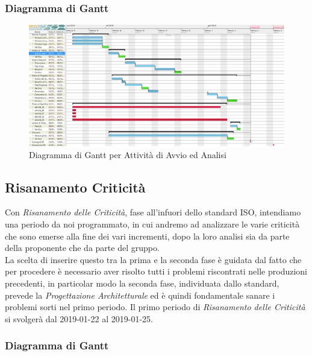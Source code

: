 \begin{landscape}
\subsubsection{Diagramma di Gantt}
\begin{figure}[H]
	\centering
  		\includegraphics[width=1.0\linewidth]{./images/AvvioAnalisi.png}
  		\caption{Diagramma di Gantt per Attività di Avvio ed Analisi}
  		\label{fig:Gantt Avvio ed Analisi}
\end{figure}
\end{landscape}

\subsection{Risanamento Criticità}

Con \textit{Risanamento delle Criticità}, fase all'infuori dello standard ISO, intendiamo una periodo da noi programmato, in cui andremo ad analizzare le varie criticità che sono emerse alla fine dei vari incrementi, dopo la loro analisi sia da parte della proponente che da parte del gruppo. \\
La scelta di inserire questo tra la prima e la seconda fase è guidata dal fatto che per procedere è necessario aver risolto tutti i problemi riscontrati nelle produzioni precedenti, in particolar modo la seconda fase, individuata dallo standard, prevede la \textit{Progettazione Architetturale} ed è quindi fondamentale sanare i problemi sorti nel primo periodo. 
Il primo periodo di \textit{Risanamento delle Criticità} si svolgerà dal 2019-01-22 al 2019-01-25.

\subsubsection{Diagramma di Gantt}

